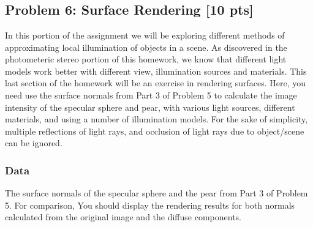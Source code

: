 \documentclass[11pt]{article}
\begin{document}
    \begin{center}
    \end{center}
    { \hspace*{\fill} \\}
    
    \begin{center}
    \end{center}
    { \hspace*{\fill} \\}
    
    \begin{center}
    \end{center}
    { \hspace*{\fill} \\}
    
    \subsection{Problem 6: Surface Rendering {[}10
pts{]}}\label{problem-6-surface-rendering-10-pts}

In this portion of the assignment we will be exploring different methods
of approximating local illumination of objects in a scene. As discovered
in the photometeric stereo portion of this homework, we know that
different light models work better with different view, illumination
sources and materials. This last section of the homework will be an
exercise in rendering surfaces. Here, you need use the surface normals
from Part 3 of Problem 5 to calculate the image intensity of the
specular sphere and pear, with various light sources, different
materials, and using a number of illumination models. For the sake of
simplicity, multiple reflections of light rays, and occlusion of light
rays due to object/scene can be ignored.

\subsubsection{Data}\label{data}

The surface normals of the specular sphere and the pear from Part 3 of
Problem 5. For comparison, You should display the rendering results for
both normals calculated from the original image and the diffuse
components.
\end{document}
